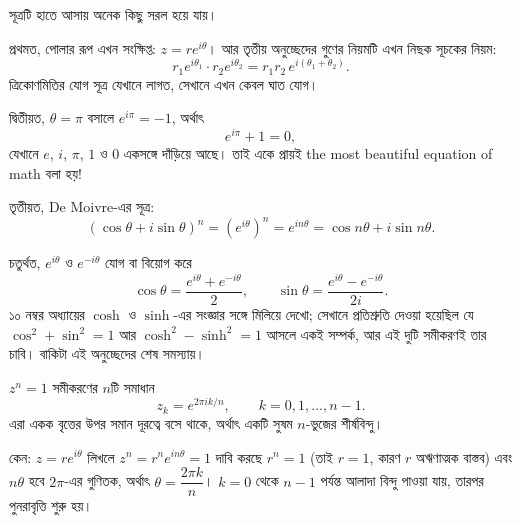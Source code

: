 \documentclass[11pt]{article}
\begin{document}
সূত্রটি হাতে আসায় অনেক কিছু সরল হয়ে যায়।

প্রথমত, পোলার রূপ এখন সংক্ষিপ্ত: $z = re^{i\theta}$। আর তৃতীয় অনুচ্ছেদের
গুণের নিয়মটি এখন নিছক সূচকের নিয়ম:
\[
  r_{1}e^{i\theta_{1}} \cdot r_{2}e^{i\theta_{2}}
  = r_{1}r_{2}\,e^{i(\theta_{1}+\theta_{2})} .
\]
ত্রিকোণমিতির যোগ সূত্র যেখানে লাগত, সেখানে এখন কেবল ঘাত যোগ।

দ্বিতীয়ত, $\theta = \pi$ বসালে $e^{i\pi} = -1$, অর্থাৎ
\[
  e^{i\pi} + 1 = 0 ,
\]
যেখানে $e$, $i$, $\pi$, $1$ ও $0$ একসঙ্গে দাঁড়িয়ে আছে। তাই একে প্রায়ই the most beautiful equation of math বলা হয়!

তৃতীয়ত, De Moivre-এর সূত্র:
\[
  \left( \cos\theta + i\sin\theta \right)^{n}
  = \left( e^{i\theta} \right)^{n} = e^{in\theta}
  = \cos n\theta + i\sin n\theta .
\]

চতুর্থত, $e^{i\theta}$ ও $e^{-i\theta}$ যোগ বা বিয়োগ করে
\[
  \cos\theta = \frac{e^{i\theta}+e^{-i\theta}}{2}, \qquad
  \sin\theta = \frac{e^{i\theta}-e^{-i\theta}}{2i} .
\]
১০ নম্বর অধ্যায়ের $\cosh$ ও $\sinh$-এর সংজ্ঞার সঙ্গে মিলিয়ে দেখো; সেখানে
প্রতিশ্রুতি দেওয়া হয়েছিল যে $\cos^{2}+\sin^{2}=1$ আর
$\cosh^{2}-\sinh^{2}=1$ আসলে একই সম্পর্ক, আর এই দুটি সমীকরণই তার চাবি। বাকিটা
এই অনুচ্ছেদের শেষ সমস্যায়।

\begin{idea}[একের মূল]
$z^{n} = 1$ সমীকরণের $n$টি সমাধান
\[
  z_{k} = e^{2\pi i k/n}, \qquad k = 0, 1, \dots, n-1 .
\]
এরা একক বৃত্তের উপর সমান দূরত্বে বসে থাকে, অর্থাৎ একটি সুষম $n$-ভুজের
শীর্ষবিন্দু।
\end{idea}

কেন: $z = re^{i\theta}$ লিখলে $z^{n} = r^{n}e^{in\theta} = 1$ দাবি করছে
$r^{n} = 1$ (তাই $r = 1$, কারণ $r$ অঋণাত্মক বাস্তব) এবং $n\theta$ হবে
$2\pi$-এর গুণিতক, অর্থাৎ $\theta = \dfrac{2\pi k}{n}$। $k = 0$ থেকে $n-1$
পর্যন্ত আলাদা বিন্দু পাওয়া যায়, তারপর পুনরাবৃত্তি শুরু হয়।

\begin{center}
\end{center}
\end{document}
